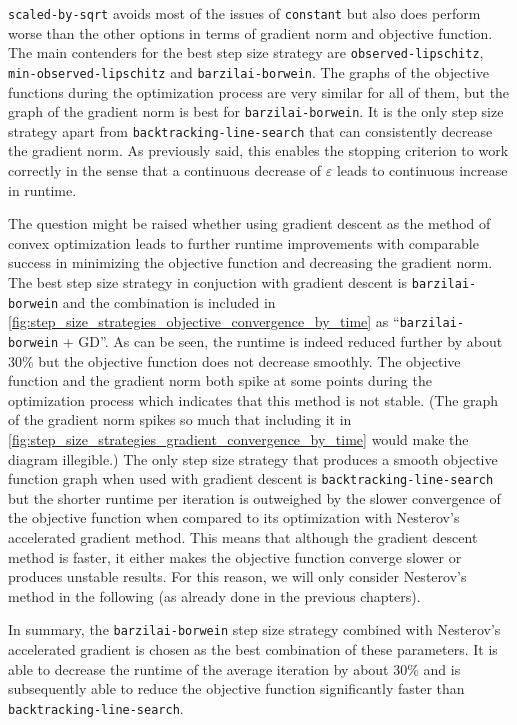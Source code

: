 \texttt{scaled-by-sqrt} avoids most of the issues of \texttt{constant} but also does perform worse than
the other options in terms of gradient norm and objective function.
The main contenders for the best step size strategy are \texttt{observed-lipschitz}, \texttt{min-observed-lipschitz}
and \texttt{barzilai-borwein}.
The graphs of the objective functions during the optimization process are very similar for all of them,
but the graph of the gradient norm is best for \texttt{barzilai-borwein}.
It is the only step size strategy apart from \texttt{backtracking-line-search} that can consistently
decrease the gradient norm.
As previously said, this enables the stopping criterion to work correctly
in the sense that a continuous decrease of \(\varepsilon\) leads to continuous increase in runtime.

The question might be raised whether using gradient descent as the method of convex optimization
leads to further runtime improvements with comparable success in minimizing the objective function
and decreasing the gradient norm.
The best step size strategy in conjuction with gradient descent is \texttt{barzilai-borwein}
and the combination is included in \cref{fig:step_size_strategies_objective_convergence_by_time}
as \enquote{\texttt{barzilai-borwein} + GD}.
As can be seen, the runtime is indeed reduced further by about 30\% but the objective function does not
decrease smoothly.
The objective function and the gradient norm both spike at some points during the optimization process
which indicates that this method is not stable.
(The graph of the gradient norm spikes so much that including it in
\cref{fig:step_size_strategies_gradient_convergence_by_time} would make the diagram illegible.)
The only step size strategy that produces a smooth objective function graph when used
with gradient descent is \texttt{backtracking-line-search} but the shorter runtime per iteration
is outweighed by the slower convergence of the objective function
when compared to its optimization with Nesterov's accelerated gradient method.
This means that although the gradient descent method is faster, it either makes the
objective function converge slower or produces unstable results.
For this reason, we will only consider Nesterov's method in the following (as already done in the previous chapters).

In summary, the \texttt{barzilai-borwein} step size strategy combined with Nesterov's accelerated gradient
is chosen as the best combination of these parameters.
It is able to decrease the runtime of the average iteration by about 30\%
and is subsequently able to reduce the objective function significantly faster
than \texttt{backtracking-line-search}.

